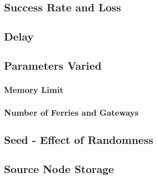 
\subsection{Success Rate and Loss}

\subsection{Delay}
%	

\subsection{Parameters Varied} %

\subsubsection{Memory Limit}

\subsubsection{Number of Ferries and Gateways}

\subsection{Seed - Effect of Randomness}

\subsection{Source Node Storage}
